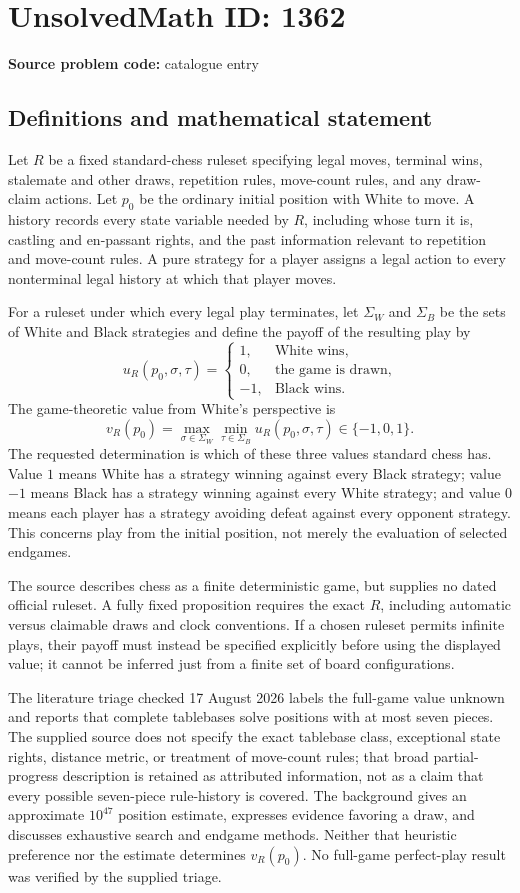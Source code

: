 \documentclass[11pt]{article}
\begin{document}
\section*{UnsolvedMath ID: 1362}
\textbf{Source problem code:} catalogue entry
\subsection{Definitions and mathematical statement}
Let $R$ be a fixed standard-chess ruleset specifying legal moves, terminal wins, stalemate and other draws, repetition rules, move-count rules, and any draw-claim actions. Let $p_0$ be the ordinary initial position with White to move. A history records every state variable needed by $R$, including whose turn it is, castling and en-passant rights, and the past information relevant to repetition and move-count rules. A pure strategy for a player assigns a legal action to every nonterminal legal history at which that player moves.

For a ruleset under which every legal play terminates, let $\Sigma_W$ and $\Sigma_B$ be the sets of White and Black strategies and define the payoff of the resulting play by
\[
 u_R(p_0,\sigma,\tau)=
 \begin{cases}
 1,&\text{White wins},\\
 0,&\text{the game is drawn},\\
 -1,&\text{Black wins}.
 \end{cases}
\]
The game-theoretic value from White's perspective is
\[
 v_R(p_0)=\max_{\sigma\in\Sigma_W}\min_{\tau\in\Sigma_B}
             u_R(p_0,\sigma,\tau)\in\{-1,0,1\}.
\]
The requested determination is which of these three values standard chess has. Value $1$ means White has a strategy winning against every Black strategy; value $-1$ means Black has a strategy winning against every White strategy; and value $0$ means each player has a strategy avoiding defeat against every opponent strategy. This concerns play from the initial position, not merely the evaluation of selected endgames.

The source describes chess as a finite deterministic game, but supplies no dated official ruleset. A fully fixed proposition requires the exact $R$, including automatic versus claimable draws and clock conventions. If a chosen ruleset permits infinite plays, their payoff must instead be specified explicitly before using the displayed value; it cannot be inferred just from a finite set of board configurations.

The literature triage checked 17 August 2026 labels the full-game value unknown and reports that complete tablebases solve positions with at most seven pieces. The supplied source does not specify the exact tablebase class, exceptional state rights, distance metric, or treatment of move-count rules; that broad partial-progress description is retained as attributed information, not as a claim that every possible seven-piece rule-history is covered. The background gives an approximate $10^{47}$ position estimate, expresses evidence favoring a draw, and discusses exhaustive search and endgame methods. Neither that heuristic preference nor the estimate determines $v_R(p_0)$. No full-game perfect-play result was verified by the supplied triage.
\end{document}
